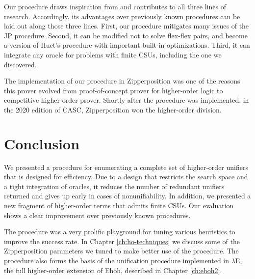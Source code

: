 Our procedure draws inspiration from and contributes to all three lines of research.
Accordingly, its advantages over previously known procedures can be laid out
along those three lines. First, our procedure mitigates many issues of the 
JP procedure. Second, it can be modified not to solve flex-flex pairs,
and become a version of Huet's procedure with important built-in optimizations.
Third, it can integrate any oracle for problems with finite CSUs, including the one we discovered.


The implementation of our procedure in Zipperposition was one of the reasons
this prover evolved from proof-of-concept prover for higher-order logic to
competitive higher-order prover. Shortly after the procedure was implemented, in the 2020 edition of CASC, Zipperposition won
the higher-order division. 

\section{Conclusion}
We presented a procedure for enumerating a complete set of higher-order unifiers
that is designed for efficiency. Due to a design that restricts 
the search space and a tight integration of oracles,
 it reduces the number of redundant unifiers returned and
gives up early in cases of nonunifiability. In addition, we presented a new
fragment of higher-order terms that admits finite CSUs. Our evaluation shows
a clear improvement over previously known procedures.

The procedure was a very prolific playground for tuning various heuristics
to improve the success rate. In Chapter \ref{ch:ho-techniques} we discuss
some of the Zipperposition parameters we tuned to make better use of the procedure.
The procedure also forms the basis of the unification procedure implemented in $\lambda$E,
the full higher-order extension of Ehoh, described in Chapter \ref{ch:ehoh2}.

